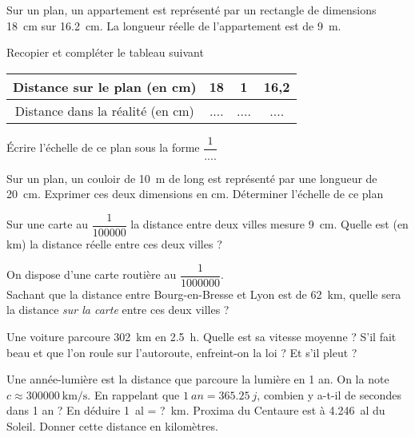 \documentclass[../Cours.tex]{subfiles}
\begin{document}
\begin{questions}

\exercice Sur un plan, un appartement est représenté par un rectangle de dimensions \qty{18}{cm} sur \qty{16,2}{cm}. La longueur réelle de l'appartement est de \qty{9}{m}.

\question Recopier et compléter le tableau suivant 
\begin{center}
\begin{tabular}{|c|c|c|c|}\hline
    Distance sur le plan (en \unit{cm}) & 18 & 1 & 16,2 \\\hline
    Distance dans la réalité (en \unit{cm}) & .... & .... & ....\\\hline
\end{tabular}
\end{center}

\question Écrire l'échelle de ce plan sous la forme $\dfrac{1}{....}$


\exercice Sur un plan, un couloir de \qty{10}{m} de long est représenté par une longueur de \qty{20}{cm}.
\question Exprimer ces deux dimensions en \unit{cm}.
\question Déterminer l'échelle de ce plan

\exercice Sur une carte au $\dfrac{1}{100000}$ la distance entre deux villes mesure \qty{9}{cm}.
\question Quelle est (en \unit{km}) la distance réelle entre ces deux villes ?

\exercice On dispose d'une carte routière au $\dfrac{1}{1000000}$. \\Sachant que la distance entre Bourg-en-Bresse et Lyon est de \qty{62}{km}, quelle sera la distance \emph{sur la carte} entre ces deux villes ?

\end{questions}

\clearpage
\EXERCICES
\begin{questions}
    \exercice Une voiture parcoure \qty{302}{\kilo\metre} en \qty{2.5}{\hour}.
    \question Quelle est sa vitesse moyenne ?
    \question S'il fait beau et que l'on roule sur l'autoroute, enfreint-on la loi ?
    \question Et s'il pleut ?

    \exercice Une année-lumière est la distance que parcoure la lumière en 1 an. On la note $c \approx \qty{300000}{\kilo\metre\per\second}$.
    \question En rappelant que $\qty{1}{an} = \qty{365.25}{j}$, combien y a-t-il de secondes dans 1 an ?
    \question En déduire \qty{1}{al} = ?~\unit{\kilo\metre}.
    \question Proxima du Centaure est à \qty{4.246}{al} du Soleil. Donner cette distance en kilomètres.
\end{questions}
\end{document}
